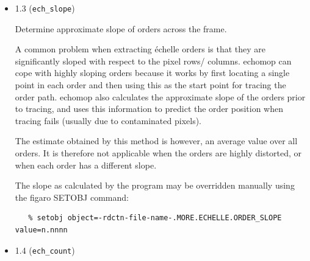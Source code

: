 \documentclass[11pt,twoside]{article}
\makeatletter
\newcommand{\xref}[3]{#1}
\newcommand{\xlabel}[1]{}
\newcommand{\mlabel}[1]{\xlabel{#1}\label{#1}}
\newcommand{\myindex}[1]{\index{#1}}
\newcommand{\indexcmdname}[1]{\index{#1@\protect\cmdname{#1}}}
\renewcommand{\myindex}[1]{}
\renewcommand{\indexcmdname}[1]{}
\newcommand{\cmdname}{\begingroup \catcode`\_=12 \realcmdname}
\newcommand{\realcmdname}[1]{\endgroup\texttt{#1}}
\makeatother
\begin{document}
\begin{itemize}
\item \mlabel{ech_slope} {1.3} (\texttt{ech\_slope})

Determine approximate slope of orders across the frame.
\myindex{Order!slope}
A common problem when extracting \'{e}chelle orders is that they are
significantly sloped with respect to the pixel rows/ columns.
{\sc echomop} can cope with highly sloping orders because it works
by first locating a single point in each order and then using this as
the start point for tracing the order path. {\sc echomop} also calculates
the approximate slope of the orders prior to tracing, and uses this
information to predict the order position when tracing fails (usually
due to contaminated pixels).

The estimate obtained by this method is however, an average value
over all orders. It is therefore not applicable when the orders are
highly distorted, or when each order has a different slope.

The slope as calculated by the program may be overridden manually
using the \xref{{\sc figaro}}{sun86}{} \xref{SETOBJ}{sun86}{SETOBJ} command:
\myindex{FIGARO!SETOBJ command}

\begin{verbatim}
   % setobj object=-rdctn-file-name-.MORE.ECHELLE.ORDER_SLOPE value=n.nnnn
\end{verbatim}


\item \mlabel{ech_count} {1.4} (\texttt{ech\_count})
\indexcmdname{ECH_COUNT}
\myindex{Order!location}
\myindex{Locating orders}


\end{itemize}
\end{document}
